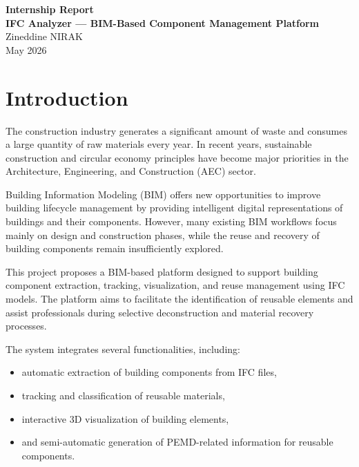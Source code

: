 \documentclass[11pt,a4paper]{article}
\begin{document}
\begin{titlepage}
\centering
\vspace*{2cm}
{\Huge\bfseries Internship Report\\[0.5cm]
\Large IFC Analyzer — BIM-Based Component Management Platform\\[2cm]}
{\large Zineddine NIRAK\\[0.3cm]
May 2026\\[3cm]}
\vfill
\end{titlepage}

\tableofcontents
\newpage

\section{Introduction}

The construction industry generates a significant amount of waste and consumes a large quantity of raw materials every year. In recent years, sustainable construction and circular economy principles have become major priorities in the Architecture, Engineering, and Construction (AEC) sector.

Building Information Modeling (BIM) offers new opportunities to improve building lifecycle management by providing intelligent digital representations of buildings and their components. However, many existing BIM workflows focus mainly on design and construction phases, while the reuse and recovery of building components remain insufficiently explored.

This project proposes a BIM-based platform designed to support building component extraction, tracking, visualization, and reuse management using IFC models. The platform aims to facilitate the identification of reusable elements and assist professionals during selective deconstruction and material recovery processes.

The system integrates several functionalities, including:
\begin{itemize}
    \item automatic extraction of building components from IFC files,
    \item tracking and classification of reusable materials,
    \item interactive 3D visualization of building elements,
    \item and semi-automatic generation of PEMD-related information for reusable components.
\end{itemize}
\end{document}
